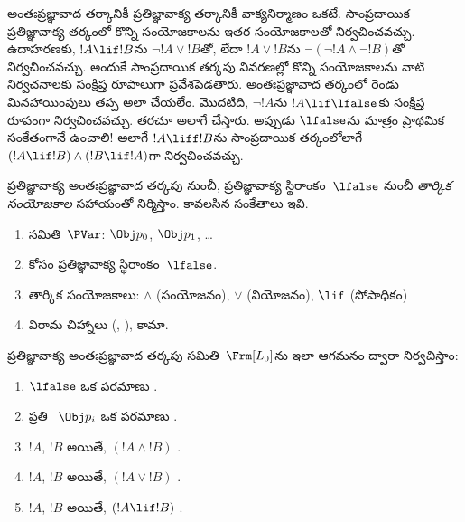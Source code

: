 \documentclass[../../../include/open-logic-section]{subfiles}
\begin{document}


అంతఃప్రజ్ఞావాద తర్కానికీ ప్రతిజ్ఞావాక్య తర్కానికీ
వాక్యనిర్మాణం ఒకటే. సాంప్రదాయిక ప్రతిజ్ఞావాక్య తర్కంలో
కొన్ని సంయోజకాలను ఇతర సంయోజకాలతో నిర్వచించవచ్చు.
ఉదాహరణకు, $!A \lif !B$ను $\lnot !A \lor !B$తో,
లేదా $!A \lor !B$ను $\lnot(\lnot !A \land \lnot
!B)$తో నిర్వచించవచ్చు. అందుకే సాంప్రదాయిక తర్కపు
వివరణల్లో కొన్ని సంయోజకాలను వాటి నిర్వచనాలకు
సంక్షిప్త రూపాలుగా ప్రవేశపెడతారు. అంతఃప్రజ్ఞావాద
తర్కంలో రెండు మినహాయింపులు తప్ప అలా చేయలేం.
మొదటిది, $\lnot !A$ను $!A \lif \lfalse$కు సంక్షిప్త రూపంగా
నిర్వచించవచ్చు. తరచూ అలాగే చేస్తారు. అప్పుడు
$\lfalse$ను మాత్రం ప్రాథమిక సంకేతంగానే ఉంచాలి!{}
అలాగే $!A \liff !B$ను సాంప్రదాయిక తర్కంలోలాగే $(!A \lif !B) \land (!B \lif
!A)$గా నిర్వచించవచ్చు.

ప్రతిజ్ఞావాక్య అంతఃప్రజ్ఞావాద తర్కపు
\emph{} నుంచీ,
ప్రతిజ్ఞావాక్య స్థిరాంకం~$\lfalse$ నుంచీ
\emph{తార్కిక సంయోజకాల} సహాయంతో నిర్మిస్తాం.
కావలసిన సంకేతాలు ఇవి.

\begin{enumerate}
\item {}
  సమితి~$\PVar$: $\Obj p_0$, $\Obj p_1$, \dots
  \item {} కోసం ప్రతిజ్ఞావాక్య స్థిరాంకం~$\lfalse$.
\item తార్కిక సంయోజకాలు: $\land$
  (సంయోజనం), $\lor$ (వియోజనం), $\lif$ (సోపాధికం)
\item విరామ చిహ్నాలు (, ), కామా.
\end{enumerate}

\begin{defn}[సూత్రం]
 ప్రతిజ్ఞావాక్య అంతఃప్రజ్ఞావాద
తర్కపు \emph{} సమితి~$\Frm[L_0]$ను
ఇలా ఆగమనం ద్వారా నిర్వచిస్తాం:
\begin{enumerate}
\item $\lfalse$ ఒక పరమాణు .

\item ప్రతి ~$\Obj p_i$
  ఒక పరమాణు .

\item $!A$, $!B$  అయితే,
  $(!A \land !B)$ .

\item $!A$, $!B$  అయితే,
  $(!A \lor !B)$ .

\item $!A$, $!B$  అయితే,
  $(!A \lif !B)$ .

\end{enumerate}
\end{defn}
\end{document}
